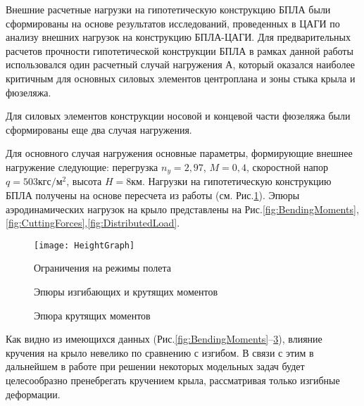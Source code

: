 Внешние расчетные нагрузки на гипотетическую конструкцию БПЛА были сформированы на основе результатов исследований, проведенных в ЦАГИ \cite{BPS_TSAGI} по анализу внешних нагрузок на конструкцию БПЛА-ЦАГИ. Для предварительных расчетов прочности гипотетической конструкции БПЛА в рамках данной работы использовался один расчетный случай нагружения А, который оказался наиболее критичным для основных силовых элементов центроплана и зоны стыка крыла и фюзеляжа. 

Для силовых элементов конструкции носовой и концевой части фюзеляжа были сформированы еще два случая нагружения. 


Для основного случая нагружения основные параметры, формирующие внешнее нагружение следующие: перегрузка $n_y = 2,97$, $M = 0,4$, скоростной напор $q = 503 \text{кгс}/\text{м}^2$, высота $H = 8\text{км}$. Нагрузки на гипотетическую конструкцию БПЛА получены на основе пересчета из работы \cite{BPS}(см. Рис.\ref{fig:ModeOfFlight}). 
Эпюры аэродинамических нагрузок на крыло представлены на Рис.\ref{fig:BendingMoments},\ref{fig:CuttingForces},\ref{fig:DistributedLoad}.



\begin{figure}[H]
\centering
\texttt{[image: HeightGraph]}
\caption{Ограничения на режимы полета}
\label{fig:ModeOfFlight}
\end{figure}

%
%


\begin{figure}[H]
\centering
\def\svgwidth{0.9\textwidth}

\caption{Эпюры изгибающих и крутящих моментов}
\label{fig:BendingAndRotatingMoments}
\end{figure}

%

%

\begin{figure}[H]
\centering
\def\svgwidth{0.9\textwidth}

\caption{Эпюра крутящих моментов}
\label{fig:RotatingMoments}
\end{figure}


Как видно из имеющихся данных (Рис.\ref{fig:BendingMoments}--\ref{fig:RotatingMoments}), влияние кручения на крыло невелико по сравнению с изгибом. В связи с этим в дальнейшем в работе при решении некоторых модельных задач будет целесообразно пренебрегать кручением крыла, рассматривая только изгибные деформации. 

